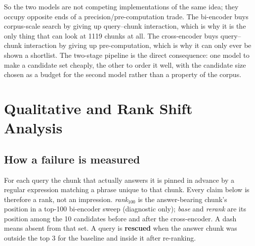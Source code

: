 \documentclass[11pt,a4paper]{article}
\begin{document}
So the two models are not competing implementations of the same idea; they
occupy opposite ends of a precision/pre-computation trade. The bi-encoder buys
corpus-scale search by giving up query--chunk interaction, which is why it is
the only thing that can look at 1119 chunks at all. The cross-encoder buys
query--chunk interaction by giving up pre-computation, which is why it can only
ever be shown a shortlist. The two-stage pipeline is the direct consequence:
one model to make a candidate set cheaply, the other to order it well, with the
candidate size chosen as a budget for the second model rather than a property of
the corpus.

\section{Qualitative and Rank Shift Analysis}

\subsection{How a failure is measured}

For each query the chunk that actually answers it is pinned in advance by a
regular expression matching a phrase unique to that chunk. Every claim below
is therefore a rank, not an impression. \textit{rank$_{100}$} is the
answer-bearing chunk's position in a top-100 bi-encoder sweep (diagnostic
only); \textit{base} and \textit{rerank} are its position among the 10
candidates before and after the cross-encoder. A dash means absent from that
set. A query is \textbf{rescued} when the answer chunk was outside the top 3
for the baseline and inside it after re-ranking.
\end{document}
